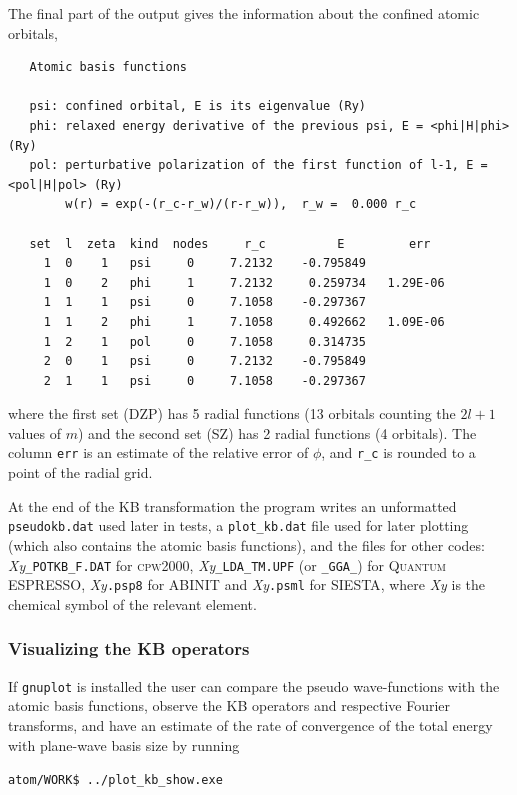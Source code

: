 \documentclass[11pt]{article}
\begin{document}
The final part of the output gives the information about the
confined atomic orbitals,
\begin{verbatim}
   Atomic basis functions

   psi: confined orbital, E is its eigenvalue (Ry)
   phi: relaxed energy derivative of the previous psi, E = <phi|H|phi> (Ry)
   pol: perturbative polarization of the first function of l-1, E = <pol|H|pol> (Ry)
        w(r) = exp(-(r_c-r_w)/(r-r_w)),  r_w =  0.000 r_c

   set  l  zeta  kind  nodes     r_c          E         err
     1  0    1   psi     0     7.2132    -0.795849
     1  0    2   phi     1     7.2132     0.259734   1.29E-06
     1  1    1   psi     0     7.1058    -0.297367
     1  1    2   phi     1     7.1058     0.492662   1.09E-06
     1  2    1   pol     0     7.1058     0.314735
     2  0    1   psi     0     7.2132    -0.795849
     2  1    1   psi     0     7.1058    -0.297367
\end{verbatim}
where the first set (DZP) has 5 radial functions (13 orbitals counting the $2l+1$
values of $m$) and the second set (SZ) has 2 radial functions (4 orbitals).
The column \texttt{err} is an estimate of the relative error of $\phi$, and
\texttt{r\_c} is rounded to a point of the radial grid.

At the end of the KB transformation the program writes an unformatted
\texttt{pseudokb.dat} used later in tests,
a \texttt{plot{\_}kb.dat} file used for later plotting (which also contains the atomic
basis functions),
and the files for other codes:
\textit{Xy}\texttt{{\_}POTKB{\_}F.DAT} for \textsc{cpw2000},
\textit{Xy}\texttt{\_LDA\_TM.UPF} (or \texttt{\_GGA\_}) for \textsc{Quantum ESPRESSO},
\textit{Xy}\texttt{.psp8} for \textsc{ABINIT} and \textit{Xy}\texttt{.psml} for \textsc{SIESTA},
where \textit{Xy} is the chemical symbol of the relevant element.


\subsubsection{Visualizing the KB operators}
\label{sec:run-show-KB}

If \texttt{gnuplot} is installed the user can compare the pseudo wave-functions with the atomic basis functions,
observe the KB operators and respective Fourier transforms, and have an estimate of the rate
of convergence of the total energy with plane-wave basis size by running

\noindent\texttt{atom/WORK\$ ../plot{\_}kb{\_}show.exe}
\end{document}
